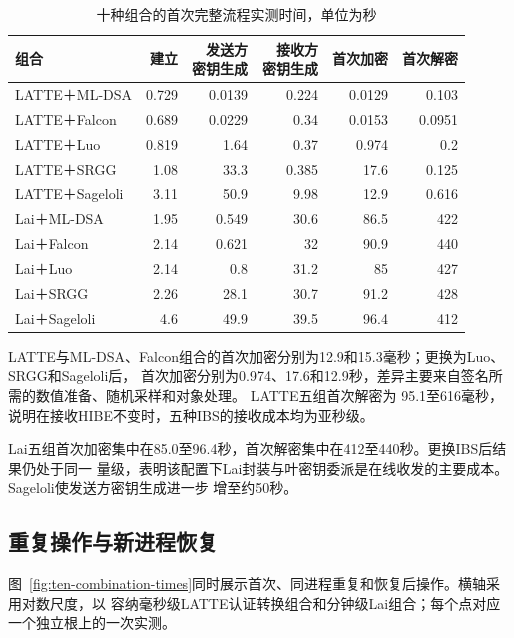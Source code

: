 \begin{table}[H]
\centering\small
\caption{十种组合的首次完整流程实测时间，单位为秒}
\label{tab:ten-first-times}
\setlength{\tabcolsep}{4pt}
\begin{tabular}{@{}lrrrrr@{}}
\toprule
\rowcolor{black!8} 组合 & 建立 & \shortstack{发送方\\密钥生成} & \shortstack{接收方\\密钥生成} & 首次加密 & 首次解密 \\
\midrule
LATTE＋ML-DSA & 0.729 & 0.0139 & 0.224 & 0.0129 & 0.103 \\
LATTE＋Falcon & 0.689 & 0.0229 & 0.34 & 0.0153 & 0.0951 \\
LATTE＋Luo & 0.819 & 1.64 & 0.37 & 0.974 & 0.2 \\
LATTE＋SRGG & 1.08 & 33.3 & 0.385 & 17.6 & 0.125 \\
LATTE＋Sageloli & 3.11 & 50.9 & 9.98 & 12.9 & 0.616 \\
Lai＋ML-DSA & 1.95 & 0.549 & 30.6 & 86.5 & 422 \\
Lai＋Falcon & 2.14 & 0.621 & 32 & 90.9 & 440 \\
Lai＋Luo & 2.14 & 0.8 & 31.2 & 85 & 427 \\
Lai＋SRGG & 2.26 & 28.1 & 30.7 & 91.2 & 428 \\
Lai＋Sageloli & 4.6 & 49.9 & 39.5 & 96.4 & 412 \\
\bottomrule
\end{tabular}
\end{table}

LATTE与ML-DSA、Falcon组合的首次加密分别为12.9和15.3毫秒；更换为Luo、SRGG和Sageloli后，
首次加密分别为0.974、17.6和12.9秒，差异主要来自签名所需的数值准备、随机采样和对象处理。
LATTE五组首次解密为
95.1至616毫秒，说明在接收HIBE不变时，五种IBS的接收成本均为亚秒级。

Lai五组首次加密集中在85.0至96.4秒，首次解密集中在412至440秒。更换IBS后结果仍处于同一
量级，表明该配置下Lai封装与叶密钥委派是在线收发的主要成本。Sageloli使发送方密钥生成进一步
增至约50秒。

\subsection{重复操作与新进程恢复}

图~\ref{fig:ten-combination-times}同时展示首次、同进程重复和恢复后操作。横轴采用对数尺度，以
容纳毫秒级LATTE认证转换组合和分钟级Lai组合；每个点对应一个独立根上的一次实测。

